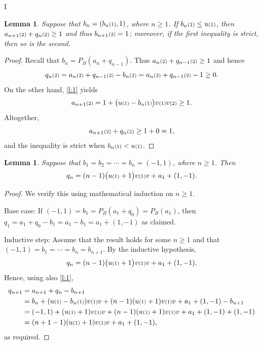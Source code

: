 I\documentclass[12pt]{article}
\newtheorem{lemma}[theorem]{Lemma}
\newcommand{\kkk}[1]{\ensuremath{\textstyle\mathsmaller{({#1})}}}
\begin{document}
\begin{lemma}
\label{l:2}
Suppose that $b_n = (b_n\kkk{1},1)$, where $n\geq 1$. 
If $b_n\kkk{1}\leq u\kkk{1}$, 
then $a_{n+1}\kkk{2}+q_n\kkk{2} \geq 1$ and thus $b_{n+1}\kkk{2}=1$; 
moreover, 
if the first inequality is strict, then so is the second.
\end{lemma}
\begin{proof}
Recall that $b_n=P_B(a_n+q_{n-1})$.
Thus 
$a_n\kkk{2}+q_{n-1}\kkk{2}\geq 1$ and
hence
\begin{equation}
q_{n}\kkk{2} = a_{n}\kkk{2}+q_{n-1}\kkk{2}-b_n\kkk{2} =
a_{n}\kkk{2}+q_{n-1}\kkk{2}- 1 \geq 0.
\end{equation}
On the other hand, \cref{l:1} yields
\begin{equation}
a_{n+1}\kkk{2} = 1 + \big(u\kkk{1}-b_n\kkk{1}\big)v\kkk{1}v\kkk{2}\geq 1.
\end{equation}
Altogether, 
\begin{equation}
  a_{n+1}\kkk{2}+q_n\kkk{2} \geq 1+0=1,
\end{equation}
and the inequality is strict when $b_n\kkk{1}<u\kkk{1}$. 
\end{proof}



\begin{lemma}
\label{l:3}
Suppose that 
$b_1=b_2=\cdots=b_n = (-1,1)$, where $n\geq 1$. 
Then 
\begin{equation}
q_n = (n-1)\big(u\kkk{1}+1\big)v\kkk{1}v + a_1+(1,-1).
\end{equation}
\end{lemma}
\begin{proof}
We verify this using mathematical induction on $n\geq 1$.

Base case: If $(-1,1)=b_1 = P_B(a_1+q_0)=P_B(a_1)$, then 
$q_1 = a_1+q_0-b_1 = a_1-b_1 = a_1+(1,-1)$ as claimed.

Inductive step: Assume that the result holds for some $n\geq 1$ 
and that $(-1,1)=b_1=\cdots=b_n=b_{n+1}$.
By the inductive hypothesis,
\begin{equation}
q_n = (n-1)\big(u\kkk{1}+1\big)v\kkk{1}v + a_1+(1,-1).
\end{equation}
Hence, using also \cref{l:1}, 
\begin{subequations}
\begin{align}
q_{n+1} &= a_{n+1}+q_n-b_{n+1}\\
&=
b_n+(u\kkk{1}-b_n\kkk{1})v\kkk{1}v 
+ (n-1)(u\kkk{1}+1)v\kkk{1}v + a_1+(1,-1) - b_{n+1}\\
&=
(-1,1)+(u\kkk{1}+1)v\kkk{1}v 
+ (n-1)(u\kkk{1}+1)v\kkk{1}v + a_1+(1,-1) + (1,-1)\\
&=
(n+1-1)(u\kkk{1}+1)v\kkk{1}v + a_1+(1,-1),
\end{align}
\end{subequations}
as required. 
\end{proof}
\end{document}
